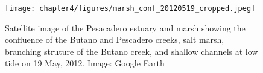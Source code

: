 \begin{figure}
\centering
	\texttt{[image: chapter4/figures/marsh\_conf\_20120519\_cropped.jpeg]}
	\caption{Satellite image of the Pesacadero estuary and marsh showing the confluence of the Butano and Pescadero creeks, salt marsh, branching struture of the Butano creek, and shallow channels at low tide on 19 May, 2012. Image: Google Earth} \label{fig:geMarsh}
\end{figure}
